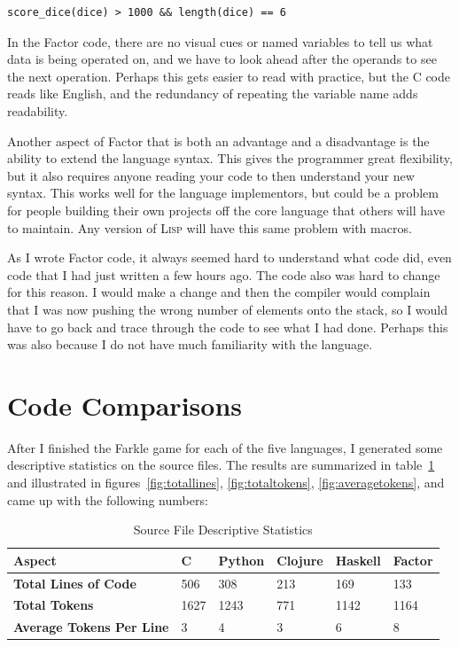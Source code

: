 \documentclass{article}
\begin{document}
\begin{verbatim}
score_dice(dice) > 1000 && length(dice) == 6
\end{verbatim}

In the Factor code, there are no visual cues or named variables to tell us what
data is being operated on, and we have to look ahead after the operands to see
the next operation.  Perhaps this gets easier to read with practice, but the C
code reads like English, and the redundancy of repeating the variable name adds
readability.

Another aspect of Factor that is both an advantage and a disadvantage is the
ability to extend the language syntax.  This gives the programmer great
flexibility, but it also requires anyone reading your code to then understand
your new syntax.  This works well for the language implementors, but could be a
problem for people building their own projects off the core language that others
will have to maintain.  Any version of \textsc{Lisp} will have this same problem
with macros.

As I wrote Factor code, it always seemed hard to understand what code did, even
code that I had just written a few hours ago.  The code also was hard to change
for this reason.  I would make a change and then the compiler would complain
that I was now pushing the wrong number of elements onto the stack, so I would
have to go back and trace through the code to see what I had done.  Perhaps this
was also because I do not have much familiarity with the language.

\section{Code Comparisons}

After I finished the Farkle game for each of the five languages, I generated
some descriptive statistics on the source files.  The results are summarized in
table~\ref{tab:programcomparison} and illustrated in
figures~\ref{fig:totallines}, \ref{fig:totaltokens}, \ref{fig:averagetokens},
and came up with the following numbers:

\begin{table}[h]
    \caption{Source File Descriptive Statistics \label{tab:programcomparison}}
    \begin{tabular}{|p{1.7in}|p{0.3in}|p{0.5in}|p{0.5in}|p{0.5in}|p{0.5in}|}
        \hline
        {\bf Aspect} & {\bf C} & {\bf Python} & {\bf Clojure} & {\bf Haskell} & {\bf Factor} \\
        \hline
        {\bf Total Lines of Code} & 506 & 308 & 213 & 169 & 133 \\
        \hline
        {\bf Total Tokens} & 1627 & 1243 & 771 & 1142 & 1164 \\
        \hline
        {\bf Average Tokens Per Line} & 3 & 4 & 3 & 6 & 8 \\
        \hline
    \end{tabular}
\end{table}
\end{document}
